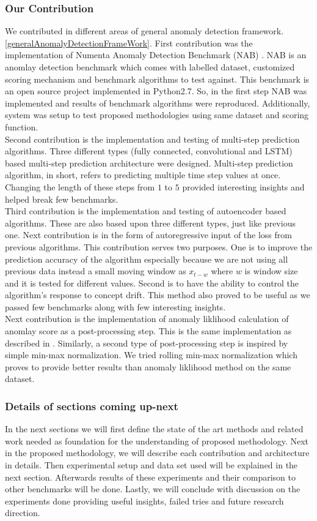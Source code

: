 \documentclass[12pt]{article}
\begin{document}
\subsubsection{Our Contribution}
We contributed in different areas of general anomaly detection framework.\ref{generalAnomalyDetectionFrameWork}. First contribution was the implementation of Numenta Anomaly Detection Benchmark (NAB) \cite{NAB}. NAB is an anomlay detection benchmark which comes with labelled dataset, customized scoring mechanism and benchmark algorithms to test against. This benchmark is an open source project implemented in Python2.7. So, in the first step NAB was implemented and results of benchmark algorithms were reproduced. Additionally, system was setup to test proposed methodologies using same dataset and scoring function.\\
\break
Second contribution is the implementation and testing of multi-step prediction algorithms. Three different types (fully connected, convolutional and LSTM) based multi-step prediction architecture were designed. Multi-step prediction algorithm, in short, refers to predicting multiple time step values at once. Changing the length of these steps from $1$ to $5$ provided interesting insights and helped break few benchmarks.\\
\break 
Third contribution is the implementation and testing of autoencoder based algorithms. These are also based upon three different types, just like previous one. Next contribution is in the form of autoregressive input of the loss from previous algorithms. This contribution serves two purposes. One is to improve the prediction accuracy of the algorithm especially because we are not using all previous data instead a small moving window as $x_{t-w}$ where $w$ is window size and it is tested for different values. Second is to have the ability to control the algorithm's response to concept drift. This method also proved to be useful as we passed few benchmarks along with few interesting insights.
\\
\break
Next contribution is the implementation of anomaly liklihood calculation of anomlay score as a post-processing step. This is the same implementation as described in \cite{ahmad2017unsupervised}. Similarly, a second type of post-processing step is inspired by simple min-max normalization. We tried rolling min-max normalization which proves to provide better results than anomaly liklihood method on the same dataset.
\subsubsection{Details of sections coming up-next}
In the next sections we will first define the state of the art methods and related work needed as foundation for the understanding of proposed methodology. Next in the proposed methodology, we will describe each contribution and architecture in details. Then experimental setup and data set used will be explained in the next section. Afterwards results of these experiments and their comparison to other benchmarks will be done. Lastly, we will conclude with discussion on the experiments done providing useful insights, failed tries and future research direction.
\newpage
\end{document}
